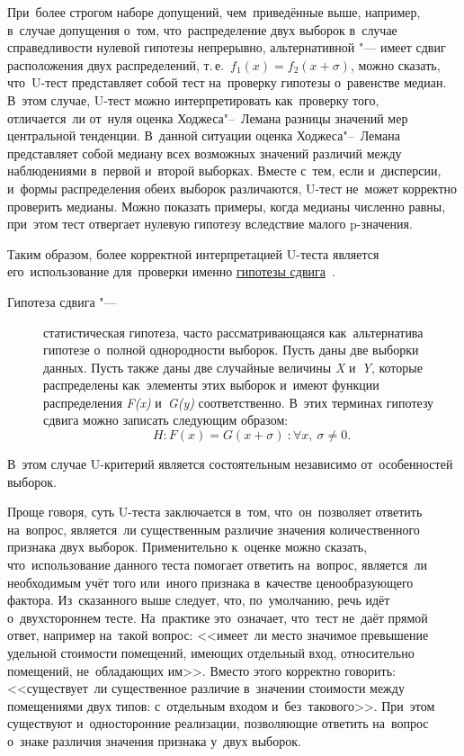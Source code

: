 \documentclass[]{scrreprt}
\begin{document}
При~более строгом наборе допущений, чем~приведённые выше, например, в~случае допущения о~том, что~распределение двух выборок в~случае справедливости нулевой гипотезы непрерывно, альтернативной "--- имеет сдвиг расположения двух распределений, т.\,е.~$f_{1}(x)=f_{2}(x+\sigma)$, можно сказать, что~U-тест представляет собой тест на~проверку гипотезы о~равенстве медиан. В~этом случае, U-тест можно интерпретировать как~проверку того, отличается~ли от~нуля оценка Ходжеса"--~Лемана разницы значений мер центральной тенденции. В~данной ситуации оценка Ходжеса"--~Лемана представляет собой медиану всех возможных значений различий между наблюдениями в~первой и~второй выборках. Вместе с~тем, если и~дисперсии, и~формы распределения обеих выборок различаются, U-тест не~может корректно проверить медианы. Можно показать примеры, когда медианы численно равны, при~этом тест отвергает нулевую гипотезу вследствие малого p-значения.

Таким образом, более корректной интерпретацией U-теста является его~использование для~проверки именно \href{http://www.machinelearning.ru/wiki/index.php?title=Гипотеза_сдвига}{гипотезы сдвига}~\cite{MLRU:shift-hypothesis}.
\begin{description}
	\item[Гипотеза сдвига "---] статистическая гипотеза, часто рассматривающаяся как~альтернатива гипотезе о~полной однородности выборок. Пусть даны две выборки данных. Пусть также даны две случайные величины \textit{X} и~\textit{Y}, которые распределены как~элементы этих выборок и~имеют функции распределения \textit{F(x)} и~\textit{G(y)} соответственно. В~этих терминах гипотезу сдвига можно записать следующим образом: 
	\begin{equation}
		H:F(x)=G(x+\sigma)\ : \forall x,\ \sigma \neq 0.
	\end{equation}
\end{description}
В~этом случае U-критерий является состоятельным независимо от~особенностей выборок.

Проще говоря, суть U-теста заключается в~том, что~он~позволяет ответить на~вопрос, является~ли существенным различие значения количественного признака двух выборок. Применительно к~оценке можно сказать, что~использование данного теста помогает ответить на~вопрос, является~ли необходимым учёт того или~иного признака в~качестве ценообразующего фактора. Из~сказанного выше следует, что, по~умолчанию, речь идёт о~двухстороннем тесте. На~практике это~означает, что~тест не~даёт прямой ответ, например на~такой вопрос: <<имеет~ли место значимое превышение удельной стоимости помещений, имеющих отдельный вход, относительно помещений, не~обладающих им>>. Вместо этого корректно говорить: <<существует~ли существенное различие в~значении стоимости между помещениями двух типов: с~отдельным входом и~без~такового>>. При~этом существуют и~односторонние реализации, позволяющие ответить на~вопрос о~знаке различия значения признака у~двух выборок.
\end{document}
